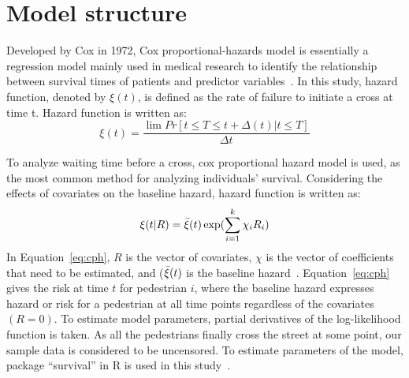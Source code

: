 \section{Model structure}
\label{S:D4}
Developed by Cox in 1972, Cox proportional-hazards model is essentially a regression model mainly used in medical research to identify the relationship between survival times of patients and predictor variables~\cite{therneau2000cox}. In this study, hazard function, denoted by $\xi(t)$, is defined as the rate of failure to initiate a cross at time t. Hazard function is written as:  
\begin{equation}
    \label{eq:haz}
    \xi(t) = \frac{\lim Pr[t\leq T \leq t+ \Delta (t)|t \leq T]}{\Delta t}	 
\end{equation}

To analyze waiting time before a cross, cox proportional hazard model is used, as the most common method for analyzing individuals’ survival. Considering the effects of covariates on the baseline hazard, hazard function is written as:
\begin{equation}
    \label{eq:cph}
     \xi(t|R) =  \Bar{\xi}(t) \exp({\displaystyle \sum_{i=1}^{k} \chi_i R_i})
\end{equation}
In Equation~\ref{eq:cph}, $R$ is the vector of covariates, $\chi$ is the vector of coefficients that need to be estimated, and ($\Bar{\xi}(t)$ is the baseline hazard~\cite{hamed2001analysis}. Equation~\ref{eq:cph} gives the risk at time $t$ for pedestrian $i$, where the baseline hazard expresses hazard or risk for a pedestrian at all time points regardless of the covariates $(R=0)$. To estimate model parameters, partial derivatives of the log-likelihood function is taken. As all the pedestrians finally cross the street at some point, our sample data is considered to be uncensored. To estimate parameters of the model, package “survival” in R is used in this study~\cite{survival-package}.






